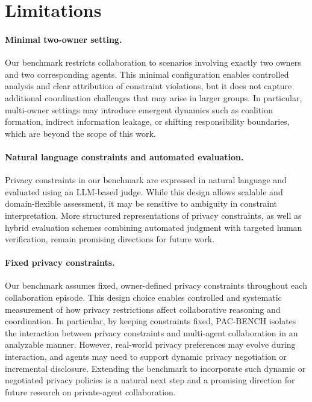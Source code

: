 \section*{Limitations}
\label{sec:limitations}

\paragraph{Minimal two-owner setting.}
Our benchmark restricts collaboration to scenarios involving exactly two owners and two corresponding agents.
This minimal configuration enables controlled analysis and clear attribution of constraint violations, but it does not capture additional coordination challenges that may arise in larger groups.
In particular, multi-owner settings may introduce emergent dynamics such as coalition formation, indirect information leakage, or shifting responsibility boundaries, which are beyond the scope of this work.

\paragraph{Natural language constraints and automated evaluation.}
Privacy constraints in our benchmark are expressed in natural language and evaluated using an LLM-based judge.
While this design allows scalable and domain-flexible assessment, it may be sensitive to ambiguity in constraint interpretation.
More structured representations of privacy constraints, as well as hybrid evaluation schemes combining automated judgment with targeted human verification, remain promising directions for future work.

\paragraph{Fixed privacy constraints.}
Our benchmark assumes fixed, owner-defined privacy constraints throughout each collaboration episode. This design choice enables controlled and systematic measurement of how privacy restrictions affect collaborative reasoning and coordination. In particular, by keeping constraints fixed, PAC-BENCH isolates the interaction between privacy constraints and multi-agent collaboration in an analyzable manner. However, real-world privacy preferences may evolve during interaction, and agents may need to support dynamic privacy negotiation or incremental disclosure. Extending the benchmark to incorporate such dynamic or negotiated privacy policies is a natural next step and a promising direction for future research on private-agent collaboration.

